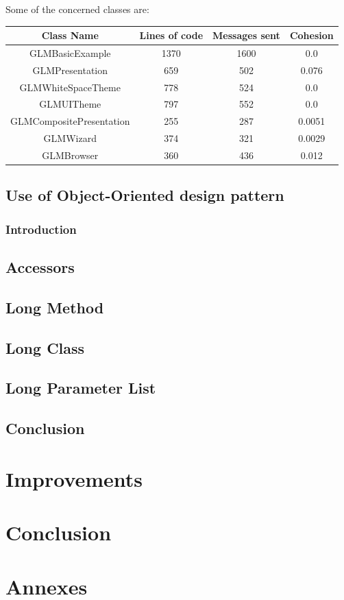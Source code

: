 \documentclass[11pt,a4paper]{article}
\begin{document}
Some of the concerned classes are:\\ 

\begin{tabular}{| c | c | c | c |}
\hline 
Class Name & Lines of code & Messages sent & Cohesion\\
\hline
GLMBasicExample & 1370 & 1600 & 0.0\\
\hline
GLMPresentation & 659 & 502 & 0.076\\
\hline
GLMWhiteSpaceTheme & 778 & 524 & 0.0\\
\hline
GLMUITheme & 797 & 552 & 0.0\\
\hline
GLMCompositePresentation & 255 & 287 & 0.0051\\
\hline 
GLMWizard &  374 & 321 & 0.0029\\
\hline
GLMBrowser & 360 & 436 & 0.012\\
\hline
\end{tabular}
\subsection{Use of Object-Oriented design pattern}
\subsubsection{Introduction} 
\subsection{Accessors} 
\subsection{Long Method}
\subsection{Long Class}
\subsection{Long Parameter List}
\subsection{Conclusion}
\section{Improvements}
\section{Conclusion}
\section{Annexes}
\end{document}
